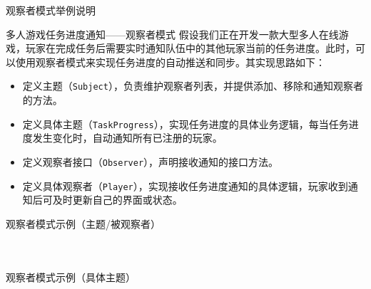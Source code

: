 \documentclass[UTF8,aspectratio=169]{beamer}
\begin{document}
\begin{frame}{观察者模式举例说明}
    \begin{exampleytublock}{多人游戏任务进度通知——观察者模式}
        假设我们正在开发一款大型多人在线游戏，玩家在完成任务后需要实时通知队伍中的其他玩家当前的任务进度。此时，可以使用观察者模式来实现任务进度的自动推送和同步。其实现思路如下：
        \begin{itemize}
            \item 定义主题（\texttt{Subject}），负责维护观察者列表，并提供添加、移除和通知观察者的方法。
            \item 定义具体主题（\texttt{TaskProgress}），实现任务进度的具体业务逻辑，每当任务进度发生变化时，自动通知所有已注册的玩家。
            \item 定义观察者接口（\texttt{Observer}），声明接收通知的接口方法。
            \item 定义具体观察者（\texttt{Player}），实现接收任务进度通知的具体逻辑，玩家收到通知后可及时更新自己的界面或状态。
        \end{itemize}
    \end{exampleytublock}
\end{frame}

\begin{frame}{观察者模式示例（主题/被观察者）}
    \begin{columns}
        \begin{column}{0.48\textwidth}
            \inputminted[firstline=1, lastline=16]{cpp}{code/observer_pattern.cpp}
        \end{column}
        \begin{column}{0.48\textwidth}
            \inputminted[firstline=18, lastline=25]{cpp}{code/observer_pattern.cpp}
        \end{column}
    \end{columns}
\end{frame}

\begin{frame}{观察者模式示例（具体主题）}
    \begin{columns}
        \begin{column}{0.48\textwidth}
            \inputminted[firstline=27, lastline=44]{cpp}{code/observer_pattern.cpp}
        \end{column}
        \begin{column}{0.48\textwidth}
            \inputminted[firstline=46, lastline=57]{cpp}{code/observer_pattern.cpp}
        \end{column}
    \end{columns}
\end{frame}
\end{document}

